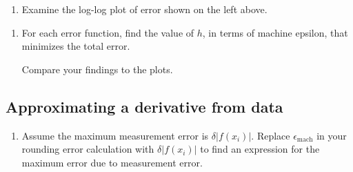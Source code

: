 \documentclass[12pt,letterpaper,noanswers]{exam}
\begin{document}
\begin{enumerate}[resume=classQ]
\item Examine the log-log plot of error shown on the left above.

\end{enumerate}



\begin{enumerate}[resume=classQ]
\item For each error function, find the value of $h$, in terms of machine epsilon, that minimizes the total error.

Compare your findings to the plots.
\vspace{1in}
\end{enumerate}

\subsection*{Approximating a derivative from data}

\begin{enumerate}[resume=classQ]
\item Assume the maximum measurement error is $\delta \vert f(x_i)\vert$.  Replace $\epsilon_{\text{mach}}$ in your rounding error calculation with $\delta \vert f(x_i)\vert$ to find an expression for the maximum error due to measurement error.

\vspace{1in}


\end{enumerate}
\end{document}
